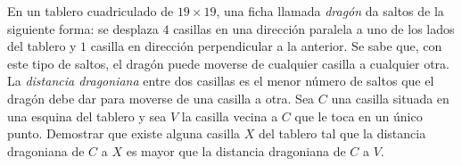 En un tablero cuadriculado de $19 \times 19$, una ficha llamada \emph{dragón} da saltos de la siguiente forma: se desplaza $4$ casillas en una dirección paralela a uno de los lados del tablero y $1$ casilla en dirección perpendicular a la anterior. \newline 
Se sabe que, con este tipo de saltos, el dragón puede moverse de cualquier casilla a cualquier otra. \newline 
La \emph{distancia dragoniana} entre dos casillas es el menor número de saltos que el dragón debe dar para moverse de una casilla a otra. \newline 
Sea $C$ una casilla situada en una esquina del tablero y sea $V$ la casilla vecina a $C$ que le toca en un único punto. \newline 
Demostrar que existe alguna casilla $X$ del tablero tal que la distancia dragoniana de $C$ a $X$ es mayor que la distancia dragoniana de $C$ a $V$.
